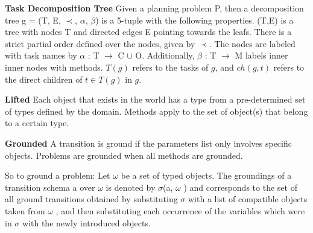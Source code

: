 
\textbf{Task Decomposition Tree}
Given a planning problem P, then a decomposition tree g = (T, E, $\prec$, $\alpha$, $\beta$) is a 5-tuple with the following properties. (T,E) is a tree with nodes T and directed edges E pointing towards the leafs. There is a strict partial order defined over the nodes, given by $\prec$. The nodes are labeled with task names by $\alpha$ : T $\rightarrow$ C $\cup$ O.  Additionally, $\beta$ : T $\rightarrow$ M labels inner inner nodes with methods.
$T(g)$ refers to the tasks of $g$, and $ch(g,t)$ refers to the direct children of $t \in T(g)$ in $g$. 
 

\textbf{Lifted}
Each object that exists in the world has a type from a pre-determined set of types defined by the domain.
Methods apply to the set of object(s) that belong to a certain type.

\textbf{Grounded}
A transition is ground if the parameters list only involves specific objects. 
Problems are grounded when all methods are grounded.

So to ground a problem: Let $\omega$ be a set of typed objects. The groundings of
a transition schema a over $\omega$  is denoted by $\sigma$(a, $\omega$ ) and corresponds to the set of all ground transitions obtained by
substituting $\sigma$ with a list of compatible objects taken from $\omega$ , and then substituting each occurrence of the variables
which were in $\sigma$ with the newly introduced objects.  

